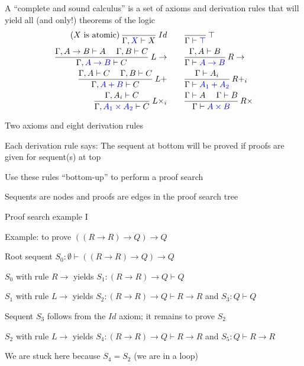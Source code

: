 A \textsf{``}complete and sound calculus\textsf{''} is a set of axioms and derivation
rules that will yield all (and only!) theorems of the logic
\begin{align*}
\text{(}X\text{ is atomic)\,}\frac{}{\Gamma,{\color{blue}X}\vdash X}\:Id & \qquad\frac{}{\Gamma\vdash{\color{blue}\top}}\,\top\\
\frac{\Gamma,A\rightarrow B\vdash A\quad\;\Gamma,B\vdash C}{\Gamma,{\color{blue}A\rightarrow B}\vdash C}\:L\rightarrow & \qquad\frac{\Gamma,A\vdash B}{\Gamma\vdash{\color{blue}A\rightarrow B}}\,R\rightarrow\\
\frac{\Gamma,A\vdash C\quad\;\Gamma,B\vdash C}{\Gamma,{\color{blue}A+B}\vdash C}\:L+ & \qquad\frac{\Gamma\vdash A_{i}}{\Gamma\vdash{\color{blue}A_{1}+A_{2}}}\,R+_{i}\\
\frac{\Gamma,A_{i}\vdash C}{\Gamma,{\color{blue}A_{1}\times A_{2}}\vdash C}\:L\times_{i} & \qquad\frac{\Gamma\vdash A\quad\;\Gamma\vdash B}{\Gamma\vdash{\color{blue}A\times B}}\,R\times
\end{align*}

Two axioms and eight derivation rules

Each derivation rule says: The sequent at bottom will be proved if
proofs are given for sequent(s) at top

Use these rules \textsf{``}bottom-up\textsf{''} to perform a proof search

Sequents are nodes and proofs are edges in the proof search tree

Proof search example I

Example: to prove $\left(\left(R\rightarrow R\right)\rightarrow Q\right)\rightarrow Q$

Root sequent $S_{0}:\emptyset\vdash\left(\left(R\rightarrow R\right)\rightarrow Q\right)\rightarrow Q$

$S_{0}$ with rule $R\rightarrow$ yields $S_{1}:\left(R\rightarrow R\right)\rightarrow Q\vdash Q$

$S_{1}$ with rule $L\rightarrow$ yields $S_{2}:\left(R\rightarrow R\right)\rightarrow Q\vdash R\rightarrow R$
and $S_{3}:Q\vdash Q$

Sequent $S_{3}$ follows from the $Id$ axiom; it remains to prove
$S_{2}$

$S_{2}$ with rule $L\rightarrow$ yields $S_{4}:\left(R\rightarrow R\right)\rightarrow Q\vdash R\rightarrow R$
and $S_{5}:Q\vdash R\rightarrow R$

We are stuck here because $S_{4}=S_{2}$ (we are in a loop)

